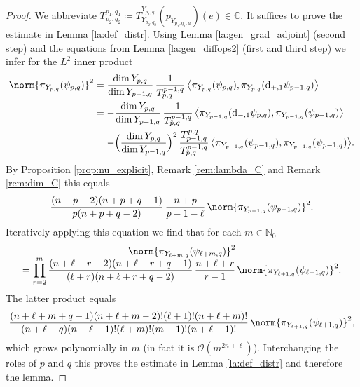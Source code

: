\documentclass[JEP,XML,SOM,NoFloatCountersInSection,Unicode,published]{cedram}
\theoremstyle{definition}
\DeclarePairedDelimiter{\norm}\lVert\rVert
\newcommand{\mc}[1]{\ensuremath{\mathcal{#1}}}
\newcommand{\N}{\ensuremath{\mathbb{N}}}
\newcommand{\C}{\ensuremath{\mathbb{C}}}
\begin{document}
\begin{proof}
We abbreviate $T^{p_1,q_1}_{p_2,q_2}\coloneqq T_{Y_{p_2,q_2}}^{Y_{p_1,q_1}}(p_{Y_{p_1,q_1,\mu}})(e)\in\C$. It suffices to prove the estimate in Lemma \ref{la:def_distr}. Using Lemma \ref{la:gen_grad_adjoint} (second step) and the equations from Lemma \ref{la:gen_diffops2} (first and third step) we infer for the $L^2$ inner product\vspace*{-3pt}
\begin{align*}
\norm{\pi_{Y_{p,q}}(\psi_{p,q})}^2&=\frac{\dim Y_{p,q}}{\dim Y_{p-1,q}}\,\frac{1}{T^{p-1,q}_{p,q}}\,\bigl\langle\pi_{Y_{p,q}}(\psi_{p,q}),\pi_{Y_{p,q}}(\mathrm{d}_{+,1}\psi_{p-1,q})\bigr\rangle\\
&=-\frac{\dim Y_{p,q}}{\dim Y_{p-1,q}}\,\frac{1}{T^{p-1,q}_{p,q}}\, \bigl\langle\pi_{Y_{p-1,q}}(\mathrm{d}_{-,1}\psi_{p,q}),\pi_{Y_{p-1,q}}(\psi_{p-1,q}) \bigr\rangle\\
&=-\Bigl(\frac{\dim Y_{p,q}}{\dim Y_{p-1,q}}\Bigr)^2\,\frac{T^{p,q}_{p-1,q}}{T^{p-1,q}_{p,q}}\, \bigl\langle\pi_{Y_{p-1,q}}(\psi_{p-1,q}),\pi_{Y_{p-1,q}}(\psi_{p-1,q}) \bigr\rangle.
\end{align*}
By Proposition \ref{prop:nu_explicit}, Remark \ref{rem:lambda_C} and Remark \ref{rem:dim_C} this equals\vspace*{-3pt}
\[
\frac{(n+p-2)(n+p+q-1)}{p(n+p+q-2)}\,\frac{n+p}{p-1-\ell}\,\norm{\pi_{Y_{p-1,q}}(\psi_{p-1,q})}^2.
\]
Iteratively applying this equation we find that for each $m\in\N_0$\vspace*{-5pt}
\begin{multline*}
\norm{\pi_{Y_{\ell+m,q}}(\psi_{\ell+m,q})}^2\\[-5pt]
=\prod_{r=2}^m\frac{(n+\ell+r-2)(n+\ell+r+q-1)}{(\ell+r)(n+\ell+r+q-2)}\,\frac{n+\ell+r}{r-1}\,\norm{\pi_{Y_{\ell+1,q}}(\psi_{\ell+1,q})}^2.
\end{multline*}
The latter product equals\vspace*{-3pt}
\[
\frac{(n+\ell+m+q-1)(n+\ell+m-2)!(\ell+1)!(n+\ell+m)!}{(n+\ell+q)(n+\ell-1)!(\ell+m)!(m-1)!(n+\ell+1)!}\,\norm{\pi_{Y_{\ell+1,q}}(\psi_{\ell+1,q})}^2,
\]
which grows polynomially in $m$ (in fact it is $\mc O(m^{2n+\ell})$). Interchanging the roles of $p$ and $q$ this proves the estimate in Lemma \ref{la:def_distr} and therefore the lemma.
\end{proof}
\end{document}
